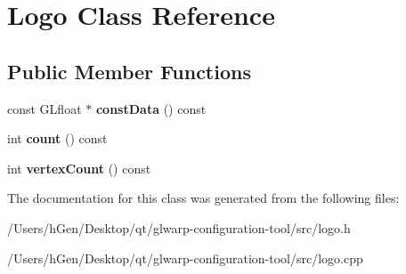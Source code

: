 \hypertarget{class_logo}{}\section{Logo Class Reference}
\label{class_logo}
\subsection*{Public Member Functions}
\begin{DoxyCompactItemize}
\item 
\mbox{\label{class_logo_a8638ab4802a6c022cf08d9824bfedab5}} 
const G\+Lfloat $\ast$ {\bfseries const\+Data} () const
\item 
\mbox{\label{class_logo_a0e4facc0ecd3aaaa829cde4bb8dfc293}} 
int {\bfseries count} () const
\item 
\mbox{\label{class_logo_a75f11bf96df060139d30effd6743e321}} 
int {\bfseries vertex\+Count} () const
\end{DoxyCompactItemize}


The documentation for this class was generated from the following files\+:\begin{DoxyCompactItemize}
\item 
/\+Users/h\+Gen/\+Desktop/qt/glwarp-\/configuration-\/tool/src/logo.\+h\item 
/\+Users/h\+Gen/\+Desktop/qt/glwarp-\/configuration-\/tool/src/logo.\+cpp\end{DoxyCompactItemize}
